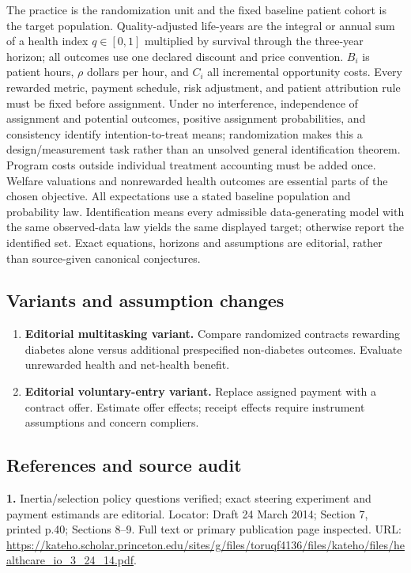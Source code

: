 \documentclass[11pt,a4paper]{article}
\begin{document}
The practice is the randomization unit and the fixed baseline patient cohort is the target population. Quality-adjusted life-years are the integral or annual sum of a health index \(q\in[0,1]\) multiplied by survival through the three-year horizon; all outcomes use one declared discount and price convention. \(B_i\) is patient hours, \(\rho\) dollars per hour, and \(C_i\) all incremental opportunity costs. Every rewarded metric, payment schedule, risk adjustment, and patient attribution rule must be fixed before assignment. Under no interference, independence of assignment and potential outcomes, positive assignment probabilities, and consistency identify intention-to-treat means; randomization makes this a design/measurement task rather than an unsolved general identification theorem. Program costs outside individual treatment accounting must be added once. Welfare valuations and nonrewarded health outcomes are essential parts of the chosen objective. All expectations use a stated baseline population and probability law. Identification means every admissible data-generating model with the same observed-data law yields the same displayed target; otherwise report the identified set. Exact equations, horizons and assumptions are editorial, rather than source-given canonical conjectures.
\subsection*{Variants and assumption changes}
\begin{enumerate}
\item \textbf{Editorial multitasking variant.} Compare randomized contracts rewarding diabetes alone versus additional prespecified non-diabetes outcomes. Evaluate unrewarded health and net-health benefit.
\item \textbf{Editorial voluntary-entry variant.} Replace assigned payment with a contract offer. Estimate offer effects; receipt effects require instrument assumptions and concern compliers.
\end{enumerate}
\subsection*{References and source audit}
\textbf{1.} Inertia/selection policy questions verified; exact steering experiment and payment estimands are editorial. Locator: Draft 24 March 2014; Section 7, printed p.40; Sections 8–9. Full text or primary publication page inspected. URL: \url{https://kateho.scholar.princeton.edu/sites/g/files/toruqf4136/files/kateho/files/healthcare_io_3_24_14.pdf}.
\end{document}
